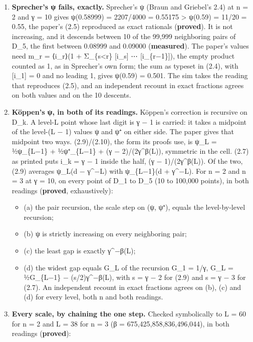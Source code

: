 \begin{enumerate}
\item \textbf{Sprecher's ψ fails, exactly.} Sprecher's ψ (Braun and Griebel's 2.4) at n = 2 and γ = 10 gives ψ(0.58999) = 2207/4000 = 0.55175 > ψ(0.59) = 11/20 = 0.55, the paper's (2.5) reproduced as exact rationals (\textbf{proved}). It is not increasing, and it descends between 10 of the 99,999 neighboring pairs of D\_\allowbreak{}5, the first between 0.08999 and 0.09000 (\textbf{measured}). The paper's values need m\_\allowbreak{}r = ⟨i\_\allowbreak{}r⟩(1 + Σ\_\allowbreak{}\{s<r\} [i\_\allowbreak{}s] ⋯ [i\_\allowbreak{}\{r−1\}]), the empty product counted as 1, as in Sprecher's own form; the sum as typeset in (2.4), with [i\_\allowbreak{}1] = 0 and no leading 1, gives ψ(0.59) = 0.501. The sim takes the reading that reproduces (2.5), and an independent recount in exact fractions agrees on both values and on the 10 descents.
\item \textbf{Köppen's ψ, in both of its readings.} Köppen's correction is recursive on D\_\allowbreak{}k. A level-L point whose last digit is γ − 1 is carried: it takes a midpoint of the level-(L − 1) values ψ and ψ⁺ on either side. The paper gives that midpoint two ways. (2.9)/(2.10), the form its proofs use, is ψ\_\allowbreak{}L = ½ψ\_\allowbreak{}\{L−1\} + ½ψ⁺\_\allowbreak{}\{L−1\} + (γ − 2)/(2γ\textasciicircum{}β(L)), symmetric in the cell. (2.7) as printed puts i\_\allowbreak{}k = γ − 1 inside the half, (γ − 1)/(2γ\textasciicircum{}β(L)). Of the two, (2.9) averages ψ\_\allowbreak{}L(d − γ\textasciicircum{}−L) with ψ\_\allowbreak{}\{L−1\}(d + γ\textasciicircum{}−L). For n = 2 and n = 3 at γ = 10, on every point of D\_\allowbreak{}1 to D\_\allowbreak{}5 (10 to 100,000 points), in both readings (\textbf{proved}, exhaustively):

\begin{itemize}
\item (a) the pair recursion, the scale step on (ψ, ψ⁺), equals the level-by-level recursion;
\item (b) ψ is strictly increasing on every neighboring pair;
\item (c) the least gap is exactly γ\textasciicircum{}−β(L);
\item (d) the widest gap equals G\_\allowbreak{}L of the recursion G\_\allowbreak{}1 = 1/γ, G\_\allowbreak{}L = ½G\_\allowbreak{}\{L−1\} − (s/2)γ\textasciicircum{}−β(L), with s = γ − 2 for (2.9) and s = γ − 3 for (2.7). An independent recount in exact fractions agrees on (b), (c) and (d) for every level, both n and both readings.
\end{itemize}
\item \textbf{Every scale, by chaining the one step.} Checked symbolically to L = 60 for n = 2 and L = 38 for n = 3 (β = 675,425,858,836,496,044), in both readings (\textbf{proved}):


\end{enumerate}
